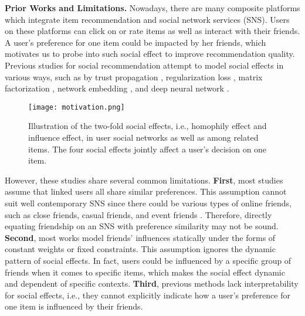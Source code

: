 \documentclass[sigconf]{acmart}
\begin{document}
\textbf{Prior Works and Limitations.} Nowadays, there are many composite platforms which integrate item recommendation and social network services (SNS). 
Users on these platforms can click on or rate items as well as interact with their friends. 
A user's preference for one item could be impacted by her friends, which motivates us to probe into such social effect to improve recommendation quality. 
Previous studies for social recommendation attempt to model social effects in various ways, such as by trust propagation  \cite{Trust1,Trust2,Trust3}, regularization loss \cite{SocReg,SocialMF}, matrix factorization \cite{MF1,MF2,TrustMF}, network embedding \cite{SREPS,NetRep1,DBLP:conf/cikm/ZhangLNLX18}, and deep neural network \cite{Deep1,NSCR}. 

\begin{figure}[h]
	\centering
	\texttt{[image: motivation.png]}
	\vspace{-5pt}
	\caption{Illustration of the two-fold social effects, i.e., homophily effect and influence effect, in user social networks as well as among related items. The four social effects jointly affect a user's decision on one item.}
	\label{fig-motivation}
	\vspace{-5pt}
\end{figure}

However, these studies share several common limitations. \textbf{First}, most studies assume that linked users all share similar preferences. This assumption cannot suit well contemporary SNS since there could be various types of online friends, such as close friends, casual friends, and event friends \cite{Friends}. 
Therefore, {directly equating} friendship on an SNS with preference similarity may not be sound. 
\textbf{Second}, most works model friends' influences statically under the forms of constant weights or fixed constraints. 
This assumption ignores the dynamic pattern of social effects. 
In fact, users could be influenced by a specific group of friends when it comes to specific items, which makes the social effect dynamic and dependent of specific contexts. 
\textbf{Third}, previous methods lack interpretability for social effects, i.e., they cannot explicitly indicate how a user's preference for one item is influenced by their friends.
\end{document}
